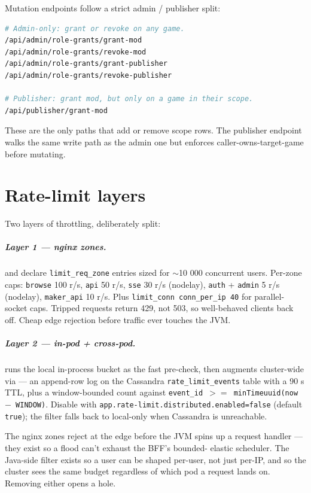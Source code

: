\documentclass[11pt,a4paper,openany]{book}
\begin{document}
Mutation endpoints follow a strict admin / publisher split:

\begin{lstlisting}[language=bash,xleftmargin=4mm]
# Admin-only: grant or revoke on any game.
/api/admin/role-grants/grant-mod
/api/admin/role-grants/revoke-mod
/api/admin/role-grants/grant-publisher
/api/admin/role-grants/revoke-publisher

# Publisher: grant mod, but only on a game in their scope.
/api/publisher/grant-mod
\end{lstlisting}

These are the only paths that add or remove scope rows. The publisher
endpoint walks the same write path as the admin one but enforces
caller-owns-target-game before mutating.

\chapter{Rate-limit layers}
Two layers of throttling, deliberately split:

\paragraph{Layer 1 --- nginx zones.}
 and 
declare \texttt{limit\_req\_zone} entries sized for $\sim$10 000
concurrent users. Per-zone caps: \texttt{browse} 100 r/s,
\texttt{api} 50 r/s, \texttt{sse} 30 r/s (nodelay), \texttt{auth}
+ \texttt{admin} 5 r/s (nodelay), \texttt{maker\_api} 10 r/s. Plus
\texttt{limit\_conn conn\_per\_ip 40} for parallel-socket caps.
Tripped requests return 429, not 503, so well-behaved clients back
off. Cheap edge rejection before traffic ever touches the JVM.

\paragraph{Layer 2 --- in-pod + cross-pod.}
 runs the local in-process bucket as the
fast pre-check, then augments cluster-wide via
 --- an append-row log on the
Cassandra \texttt{rate\_limit\_events} table with a 90 s TTL, plus a
window-bounded count against
\texttt{event\_id $>=$ minTimeuuid(now $-$ WINDOW)}. Disable with
\texttt{app.rate-limit.distributed.enabled=false} (default
\texttt{true}); the filter falls back to local-only when Cassandra
is unreachable.

\begin{snapcaution}[title={Don't replace one layer with the other}]
The nginx zones reject at the edge before the JVM spins up a request
handler --- they exist so a flood can't exhaust the BFF's bounded-
elastic scheduler. The Java-side filter exists so a user can be
shaped per-user, not just per-IP, and so the cluster sees the same
budget regardless of which pod a request lands on. Removing either
opens a hole.
\end{snapcaution}
\end{document}
